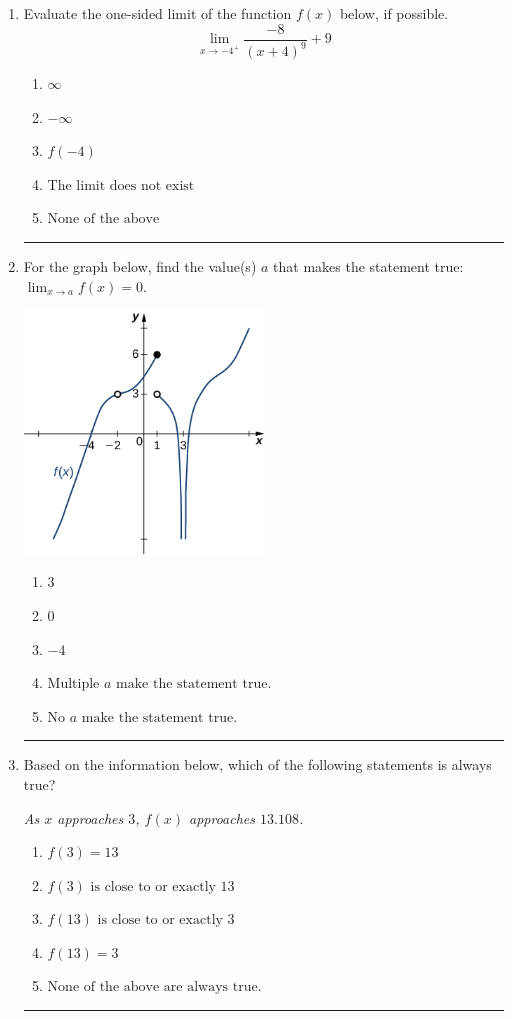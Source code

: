 \documentclass[14pt]{extbook}
\newcommand{\litem}[1]{\item#1\hspace*{-1cm}\rule{\textwidth}{0.4pt}}
\begin{document}
\begin{enumerate}
{\begin{enumerate}[label=\Alph*.]
\end{enumerate} }
\litem{
Evaluate the one-sided limit of the function $f(x)$ below, if possible.\[ \lim_{x \rightarrow -4^+} \frac{-8}{(x+4)^9}+9 \]\begin{enumerate}[label=\Alph*.]
\item \( \infty \)
\item \( -\infty \)
\item \( f(-4) \)
\item \( \text{The limit does not exist} \)
\item \( \text{None of the above} \)

\end{enumerate} }
\litem{
For the graph below, find the value(s) $a$ that makes the statement true: $ \displaystyle \lim_{x \rightarrow a} f(x) = 0$.
\begin{center}
    \includegraphics[width=0.5\textwidth]{../Figures/evaluateLimitGraphicallyCopyC.png}
\end{center}
\begin{enumerate}[label=\Alph*.]
\item \( 3 \)
\item \( 0 \)
\item \( -4 \)
\item \( \text{Multiple } a \text{ make the statement true}. \)
\item \( \text{No } a \text{ make the statement true}. \)

\end{enumerate} }
\litem{
Based on the information below, which of the following statements is always true?
\begin{center}
    \textit{ As $x$ approaches $3$, $f(x)$ approaches $13.108$. }
\end{center}
\begin{enumerate}[label=\Alph*.]
\item \( f(3) = 13 \)
\item \( f(3) \text{ is close to or exactly } 13 \)
\item \( f(13) \text{ is close to or exactly } 3 \)
\item \( f(13) = 3 \)
\item \( \text{None of the above are always true.} \)


\end{enumerate}}
\end{enumerate}
\end{document}
